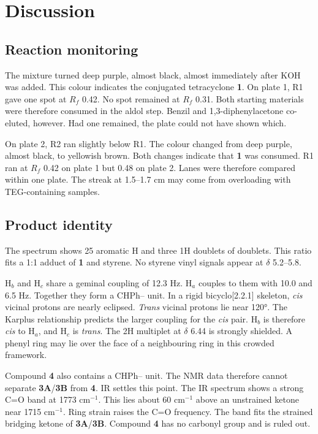 \documentclass[11pt,a4paper]{article}
\begin{document}
\section{Discussion}

\subsection{Reaction monitoring}
The mixture turned deep purple, almost black, almost immediately after KOH was added. This colour indicates the conjugated tetracyclone \textbf{1}. On plate 1, R1 gave one spot at $R_f$ 0.42. No spot remained at $R_f$ 0.31. Both starting materials were therefore consumed in the aldol step. Benzil and 1,3-diphenylacetone co-eluted, however. Had one remained, the plate could not have shown which.

On plate 2, R2 ran slightly below R1. The colour changed from deep purple, almost black, to yellowish brown. Both changes indicate that \textbf{1} was consumed. R1 ran at $R_f$ 0.42 on plate 1 but 0.48 on plate 2. Lanes were therefore compared within one plate. The streak at 1.5--1.7 cm may come from overloading with TEG-containing samples.

\subsection{Product identity}
The spectrum shows 25 aromatic H and three 1H doublets of doublets. This ratio fits a 1:1 adduct of \textbf{1} and styrene. No styrene vinyl signals appear at $\delta$ 5.2--5.8.

H$_b$ and H$_c$ share a geminal coupling of 12.3 Hz. H$_a$ couples to them with 10.0 and 6.5 Hz. Together they form a CHPh-- unit. In a rigid bicyclo[2.2.1] skeleton, \emph{cis} vicinal protons are nearly eclipsed. \emph{Trans} vicinal protons lie near 120\si{\degree}. The Karplus relationship predicts the larger coupling for the \emph{cis} pair.\cite{Karplus1959} H$_b$ is therefore \emph{cis} to H$_a$, and H$_c$ is \emph{trans}. The 2H multiplet at $\delta$ 6.44 is strongly shielded. A phenyl ring may lie over the face of a neighbouring ring in this crowded framework.

Compound \textbf{4} also contains a CHPh-- unit. The NMR data therefore cannot separate \textbf{3A}/\textbf{3B} from \textbf{4}. IR settles this point. The IR spectrum shows a strong C=O band at 1773 cm$^{-1}$. This lies about 60 cm$^{-1}$ above an unstrained ketone near 1715 cm$^{-1}$. Ring strain raises the C=O frequency.\cite{Pavia} The band fits the strained bridging ketone of \textbf{3A}/\textbf{3B}. Compound \textbf{4} has no carbonyl group and is ruled out.
\end{document}
